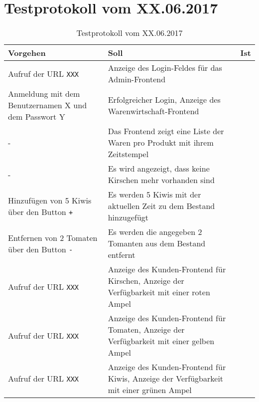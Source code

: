 \section{Testprotokoll vom XX.06.2017}
\label{sec: Testprotokoll vom XX.06.2017}

\begin{table}[H]
\begin{small}
	\begin{center}
  	\caption{Testprotokoll vom XX.06.2017}
   	\renewcommand{\arraystretch}{1.2}
    \begin{tabularx}{\textwidth}{|X|X|L{2cm}|}	
    \hline
    				
    \textbf{Vorgehen} & \textbf{Soll} & \textbf{Ist} \\ \hline
    
    Aufruf der URL \texttt{XXX} & 
    Anzeige des Login-Feldes für das Admin-Frontend &
     \\ \hline
    
    Anmeldung mit dem Benutzernamen X und dem Passwort Y & 
    Erfolgreicher Login, Anzeige des Warenwirtschaft-Frontend &
     \\ \hline
    
    - & 
    Das Frontend zeigt eine Liste der Waren pro Produkt mit ihrem Zeitstempel &
     \\ \hline
     
     - &
     Es wird angezeigt, dass keine Kirschen mehr vorhanden sind & 
    \\ \hline
    
    Hinzufügen von 5 Kiwis über den Button \texttt{+} &
    Es werden 5 Kiwis mit der aktuellen Zeit zu dem Bestand hinzugefügt &
    \\ \hline
    
    Entfernen von 2 Tomaten über den Button \texttt{-} &
    Es werden die angegeben 2 Tomanten aus dem Bestand entfernt & 
    \\ \hline
    
    Aufruf der URL \texttt{XXX} &
    Anzeige des Kunden-Frontend für Kirschen,
    Anzeige der Verfügbarkeit mit einer roten Ampel &
    \\ \hline
    
    Aufruf der URL \texttt{XXX} &
    Anzeige des Kunden-Frontend für Tomaten,
    Anzeige der Verfügbarkeit mit einer gelben Ampel &
	\\ \hline
    
    Aufruf der URL \texttt{XXX} &
    Anzeige des Kunden-Frontend für Kiwis,
    Anzeige der Verfügbarkeit mit einer grünen Ampel &
	\\ \hline
	

\end{tabularx}
\end{center}
\end{small}
\end{table}
